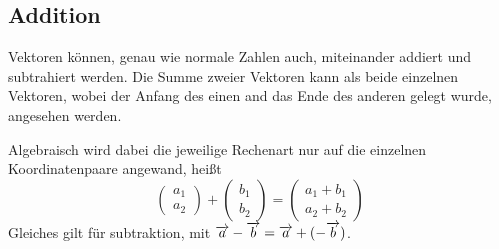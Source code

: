 \documentclass{article}
\begin{document}
\subsection{Addition} 
Vektoren können, genau wie normale Zahlen auch, miteinander addiert und subtrahiert werden. Die Summe zweier Vektoren kann als beide einzelnen Vektoren, wobei der Anfang des einen and das Ende des anderen gelegt wurde, angesehen werden. \newline 
\begin{wrapfigure}[6]{l}{5cm}
  \centering
\end{wrapfigure}
Algebraisch wird dabei die jeweilige Rechenart nur auf die einzelnen Koordinatenpaare angewand, heißt 
\[ 
 \begin{pmatrix} a_1 \\ a_2 \end{pmatrix} +
 \begin{pmatrix} b_1 \\ b_2 \end{pmatrix} =
 \begin{pmatrix} a_1 + b_1 \\ a_2 + b_2 \end{pmatrix} 
\]
Gleiches gilt für subtraktion, mit $\overrightarrow{a} - \overrightarrow{b} = \overrightarrow{a} + (-\overrightarrow{b})$.
 
\end{document}
